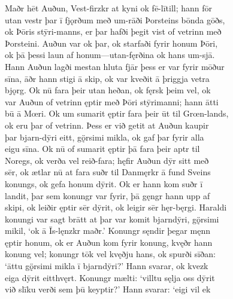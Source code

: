\documentclass[12pt,letterpaper]{book}
\begin{document}
\resetlinenumber
\begin{linenumbers}

Maðr hēt Auðun, Vest-firzkr at kyni ok fē-lītill; hann fōr\\
utan vestr þar ī fjǫrðum með um-rāði Þorsteins bōnda gōðs,\\
ok Þōris stȳri-manns, er þar hafði þegit vist of vetrinn með\\
Þorsteini.  Auðun var ok þar, ok starfaði fyrir honum Þōri,\\
ok þā þessi laun af honum---utan-fęrðina ok hans um-sjā.\\
Hann Auðun lagði mestan hluta fjār þess er var fyrir mōður\\
sīna, āðr hann stigi ā skip, ok var kveðit ā þriggja vetra\\
bjǫrg.  Ok nū fara þeir utan heðan, ok fęrsk þeim vel, ok\\
var Auðun of vetrinn ęptir með Þōri stȳrimanni; hann ātti\\
bū ā Mœri.  Ok um sumarit ęptir fara þeir ūt til Grœn-lands,\\
ok eru þar of vetrinn.  Þess er við getit at Auðun kaupir\\
þar bjarn-dȳri eitt, gǫ̈rsimi mikla, ok gaf þar fyrir alla\\
eigu sīna.  Ok nū of sumarit ęptir þā fara þeir aptr til\\
Noregs, ok verða vel reið-fara; hęfir Auðun dȳr sitt með\\
sēr, ok ætlar nū at fara suðr til Danmęrkr ā fund Sveins\\
konungs, ok gefa honum dȳrit.  Ok er hann kom suðr ī\\
landit, þar sem konungr var fyrir, þā gęngr hann upp af\\
skipi, ok leiðir ęptir sēr dȳrit, ok leigir sēr hęr-bęrgi.  Haraldi\\
konungi var sagt brātt at þar var komit bjarndȳri, gǫ̈rsimi\\
mikil, `ok ā Īs-lęnzkr maðr.'  Konungr sęndir þegar męnn\\
ęptir honum, ok er Auðun kom fyrir konung, kvęðr hann\\
konung vel; konungr tōk vel kvęðju hans, ok spurði sīðan:\\
`āttu gǫ̈rsimi mikla ī bjarndȳri?'  Hann svarar, ok kvezk\\
eiga dȳrit eitthvęrt.  Konungr mælti: `villtu sęlja oss dȳrit\\
við slīku verði sem þū keyptir?'  Hann svarar: `eigi vil ek\\

\end{linenumbers}
\end{document}
